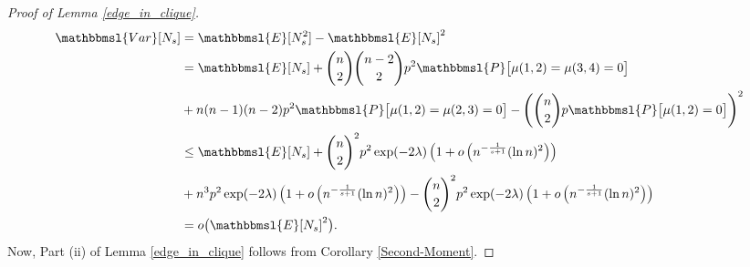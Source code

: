 \documentclass[hidelinks, 11pt]{article}
\theoremstyle{plain}
\theoremstyle{definition}
\begin{document}
\begin{proof}[Proof of Lemma \ref{edge_in_clique}]
\begin{align*}
\mathbbmsl{Var}[N_s]&=\mathbbmsl{E}[N_s^2]-\mathbbmsl{E}[N_s]^2\\&=\mathbbmsl{E}[N_s]+{n\choose 2}{n-2\choose 2}p^2\mathbbmsl{P}\big[\mu(1,2)=\mu(3,4)=0\big]\\&+
n(n-1)(n-2)p^2\mathbbmsl{P}\big[\mu(1,2)=\mu(2,3)=0\big]-\left({n\choose 2}p\mathbbmsl{P}\big[\mu(1,2)=0\big]\right)^2\\&\leq
\mathbbmsl{E}[N_s]+{n\choose 2}^2p^2\exp(-2\lambda)\left(1+o\left(n^{-\frac{1}{s+1}}(\ln n)^2\right)\right)\\&+
n^3p^2\exp(-2\lambda)\left(1+o\left(n^{-\frac{1}{s+1}}(\ln n)^2\right)\right) - {n\choose 2}^2p^2\exp(-2\lambda)\left(1+o\left(n^{-\frac{1}{s+1}}(\ln n)^2\right)\right)\\&=o\big(\mathbbmsl{E}[N_s]^2\big).
\end{align*}
Now, Part (ii)  of Lemma \ref{edge_in_clique}  follows from Corollary   \ref{Second-Moment}.
\end{proof}
\end{document}
